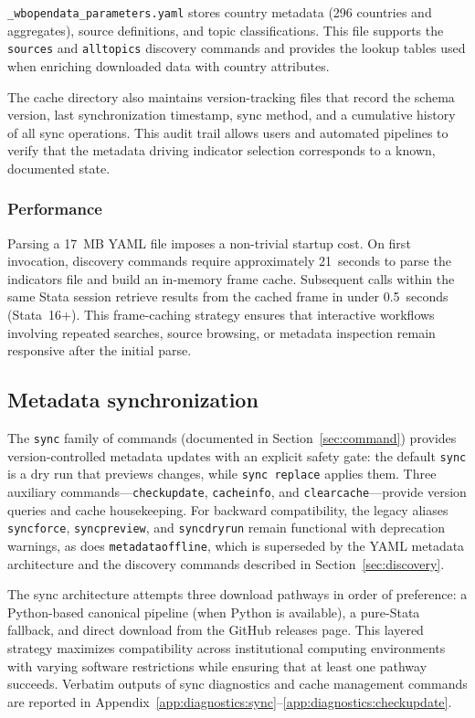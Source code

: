 \documentclass[bib]{statapress}
\begin{document}
\hangpara
\texttt{\_wbopendata\_parameters.yaml} stores country metadata (296 countries
and aggregates), source definitions, and topic classifications. This file
supports the \texttt{sources} and \texttt{alltopics} discovery commands and
provides the lookup tables used when enriching downloaded data with country
attributes.

The cache directory also maintains version-tracking files that record the
schema version, last synchronization timestamp, sync method, and a cumulative
history of all sync operations. This audit trail allows users and automated
pipelines to verify that the metadata driving indicator selection corresponds
to a known, documented state.

\subsubsection*{Performance}

Parsing a 17~MB YAML file imposes a non-trivial startup cost. On first
invocation, discovery commands require approximately 21~seconds to parse the
indicators file and build an in-memory frame cache. Subsequent calls within the
same Stata session retrieve results from the cached frame in under 0.5~seconds
(Stata~16+). This frame-caching strategy ensures that interactive workflows
involving repeated searches, source browsing, or metadata inspection remain
responsive after the initial parse.

\subsection{Metadata synchronization}\label{sec:sync}

The \texttt{sync} family of commands (documented in Section~\ref{sec:command})
provides version-controlled metadata updates with an explicit safety gate:
the default \texttt{sync} is a dry run that previews changes, while
\texttt{sync replace} applies them.  Three auxiliary
commands---\texttt{checkupdate}, \texttt{cacheinfo}, and
\texttt{clearcache}---provide version queries and cache housekeeping.
For backward compatibility, the legacy aliases \texttt{syncforce},
\texttt{syncpreview}, and \texttt{syncdryrun} remain functional with
deprecation warnings, as does \texttt{metadataoffline}, which is superseded
by the YAML metadata architecture and the discovery commands described in
Section~\ref{sec:discovery}.

The sync architecture attempts three download pathways in order of preference:
a Python-based canonical pipeline (when Python is available), a pure-Stata
fallback, and direct download from the GitHub releases page. This layered
strategy maximizes compatibility across institutional computing environments
with varying software restrictions while ensuring that at least one pathway
succeeds. Verbatim outputs of sync diagnostics and cache management commands
are reported in Appendix~\ref{app:diagnostics:sync}--\ref{app:diagnostics:checkupdate}.
\end{document}
